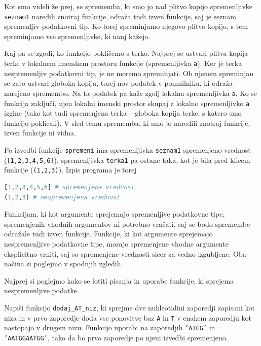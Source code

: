 \begin{resitev}
Kot smo videli že prej, se sprememba, ki smo jo nad plitvo kopijo spremenljivke \texttt{seznam1} naredili znotraj funkcije, odraža tudi izven funkcije, saj je seznam spremenljiv podatkovni tip. Ko torej spreminjamo njegovo plitvo kopijo, s tem spreminjamo vse spremenljivke, ki nanj kažejo. 

Kaj pa se zgodi, ko funkcijo pokličemo s terko. Najprej se ustvari plitva kopija terke v lokalnem imenskem prostoru funkcije (spremenljivka \texttt{a}). Ker je terka nespremenljiv podatkovni tip, je ne moremo spreminjati. Ob njenem spreminjau se zato ustvari globoka kopija, torej nov podatek v pomnilniku, ki odraža narejeno spremembo. Na ta podatek pa kaže zgolj lokalna spremenljivka \texttt{a}. Ko se funkcija zaključi, njen lokalni imenski prostor skupaj z lokalno spremenljivko \texttt{a} izgine (tako kot tudi spremenjena terka -- globoka kopija terke, s katero smo funkcijo poklicali). V sled temu sprememba, ki smo jo naredili znotraj funkcije, izven funkcije ni vidna.

Po izvedbi funkcije \texttt{spremeni} ima spremenljivka \texttt{seznam1} spremenjeno vrednost (\texttt{[1,2,3,4,5,6]}), spremenljivka \texttt{terka1} pa ostane taka, kot je bila pred klicem funkcije (\texttt{(1,2,3)}). Izpis programa je torej
\begin{lstlisting}[language=Python]
[1,2,3,4,5,6] # spremenjena vrednost
(1,2,3) # nespremenjena vrednost
\end{lstlisting}

\end{resitev}

Funkcijam, ki kot argumente sprejemajo spremenljive podatkovne tipe, spremenjenih vhodnih argumentov ni potrebno vračati, saj se bodo spremembe odražale tudi izven funkcije. Funkcije, ki kot argumente sprejemajo nespremenljive podatkovne tipe, morajo spremenjene vhodne argumente eksplicitno vrniti, saj so spremenjene vrednosti sicer za vedno izgubljene. Oba načina si poglejmo v spodnjih zgledih.

Najprej si poglejmo kako se lotiti pisanja in uporabe funkcije, ki sprejema nespremenljive podatke.
\begin{zgled}
Napiši funkcijo \texttt{dodaj\_AT\_niz}, ki sprejme dve nukleotidini zaporedji zapisani kot niza in v prvo zaporedje doda vse ponovitve baz \texttt{A} in \texttt{T} v enakem zaporedju kot nastopajo v drugem nizu. Funkcijo uporabi na zaporedjih \texttt{'ATCG'} in \texttt{'AATGGAATGG'}, tako da bo prvo zaporedje po njeni izvedbi spremenjeno.
\end{zgled}


